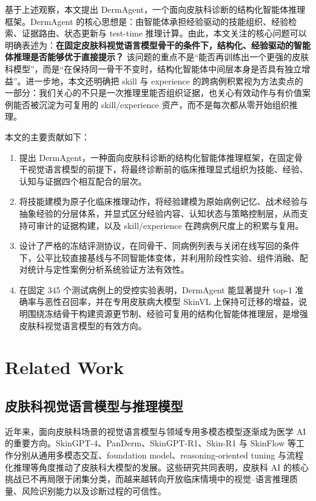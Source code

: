 \documentclass{article}
\begin{document}
基于上述观察，本文提出 DermAgent，一个面向皮肤科诊断的结构化智能体推理框架。DermAgent 的核心思想是：由智能体承担经验驱动的技能组织、经验检索、证据路由、状态更新与 test-time 推理计算。由此，本文关注的核心问题可以明确表述为：\textbf{在固定皮肤科视觉语言模型骨干的条件下，结构化、经验驱动的智能体推理是否能够优于直接提示？} 该问题的重点不是“能否再训练出一个更强的皮肤科模型”，而是“在保持同一骨干不变时，结构化智能体中间层本身是否具有独立增益”。进一步地，本文还明确把 skill 与 experience 的跨病例积累视为方法卖点的一部分：我们关心的不只是一次推理里能否组织证据，也关心有效动作与有价值案例能否被沉淀为可复用的 skill/experience 资产，而不是每次都从零开始组织推理。

本文的主要贡献如下：
\begin{enumerate}[leftmargin=1.8em]
  \item 提出 DermAgent，一种面向皮肤科诊断的结构化智能体推理框架，在固定骨干视觉语言模型的前提下，将最终诊断前的临床推理显式组织为技能、经验、认知与证据四个相互配合的层次。
  \item 将技能建模为原子化临床推理动作，将经验建模为原始病例记忆、战术经验与抽象经验的分层体系，并显式区分经验内容、认知状态与策略控制层，从而支持可审计的证据构建，以及 skill/experience 在跨病例尺度上的积累与复用。
  \item 设计了严格的冻结评测协议，在同骨干、同病例列表与关闭在线写回的条件下，公平比较直接基线与不同智能体变体，并利用阶段性实验、组件消融、配对统计与定性案例分析系统验证方法有效性。
  \item 在固定 345 个测试病例上的受控实验表明，DermAgent 能显著提升 top-1 准确率与恶性召回率，并在专用皮肤病大模型 SkinVL 上保持可迁移的增益，说明围绕冻结骨干构建资源更节制、经验可复用的结构化智能体推理层，是增强皮肤科视觉语言模型的有效方向。
\end{enumerate}

\section{Related Work}

\subsection{皮肤科视觉语言模型与推理模型}

近年来，面向皮肤科场景的视觉语言模型与领域专用多模态模型逐渐成为医学 AI 的重要方向。SkinGPT-4、PanDerm、SkinGPT-R1、Skin-R1 与 SkinFlow 等工作分别从通用多模态交互、foundation model、reasoning-oriented tuning 与流程化推理等角度推动了皮肤科大模型的发展\citep{skingpt4_2024,panderm_2025,skingptr1_2025,skinr1_2025,skinflow_2026}。这些研究共同表明，皮肤科 AI 的核心挑战已不再局限于闭集分类，而越来越转向开放临床情境中的视觉--语言推理质量、风险识别能力以及诊断过程的可信性。
\end{document}
